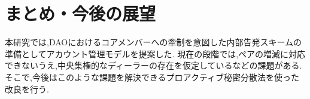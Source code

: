 \documentclass[twocolumn,10pt]{jarticle}
\begin{document}
\vspace{-0.55cm}
\section{\normalsize まとめ・今後の展望}
\vspace{-0.2cm}
本研究では,DAOにおけるコアメンバーへの牽制を意図した内部告発スキームの準備としてアカウント管理モデルを提案した.
現在の段階では,ペアの増減に対応できないうえ,中央集権的なディーラーの存在を仮定しているなどの課題がある.そこで,今後はこのような課題を解決できるプロアクティブ秘密分散法を使った改良を行う.
\end{document}
